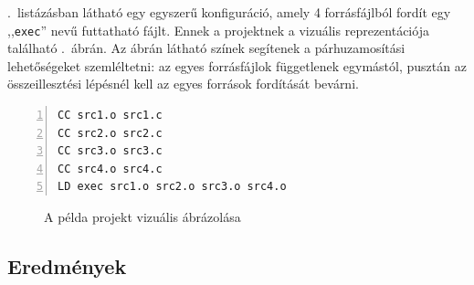 .~listázásban látható egy egyszerű konfiguráció, amely 4 forrásfájlból fordít egy ,,\texttt{exec}'' nevű futtatható fájlt.
Ennek a projektnek a vizuális reprezentációja található .~ábrán.
Az ábrán látható színek segítenek a párhuzamosítási lehetőségeket szemléltetni: az egyes forrásfájlok függetlenek egymástól, pusztán az összeillesztési lépésnél kell az egyes források fordítását bevárni.

\begin{lstlisting}[numbers=left, label=lst:lb-conf, caption={Példa lb konfiguráció}]
CC src1.o src1.c
CC src2.o src2.c
CC src3.o src3.c
CC src4.o src4.c
LD exec src1.o src2.o src3.o src4.o
\end{lstlisting}

\begin{figure}[htb]
	\caption{A példa projekt vizuális ábrázolása}
	\label{fig:lb-demo-graphic}
\end{figure}

\subsection{Eredmények}\label{sub:results}

